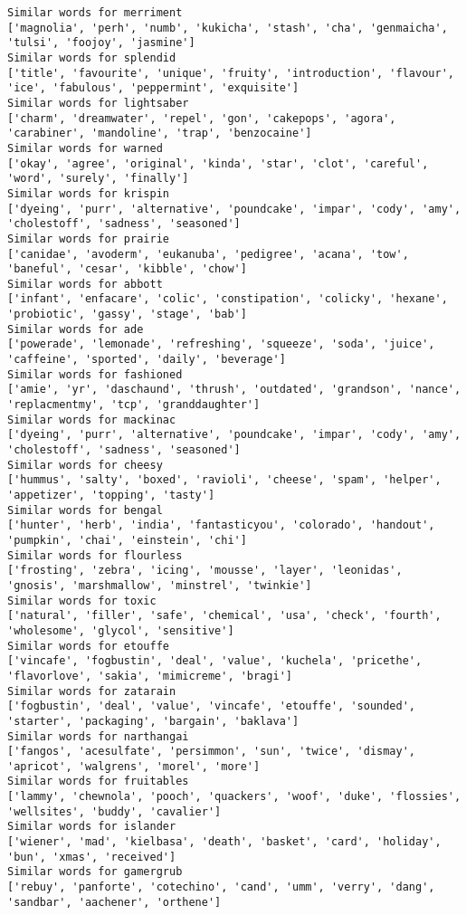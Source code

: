 \documentclass[11pt]{article}
\begin{document}
\begin{Verbatim}[commandchars=\\\{\}]
Similar words for merriment
['magnolia', 'perh', 'numb', 'kukicha', 'stash', 'cha', 'genmaicha', 'tulsi', 'foojoy', 'jasmine']
Similar words for splendid
['title', 'favourite', 'unique', 'fruity', 'introduction', 'flavour', 'ice', 'fabulous', 'peppermint', 'exquisite']
Similar words for lightsaber
['charm', 'dreamwater', 'repel', 'gon', 'cakepops', 'agora', 'carabiner', 'mandoline', 'trap', 'benzocaine']
Similar words for warned
['okay', 'agree', 'original', 'kinda', 'star', 'clot', 'careful', 'word', 'surely', 'finally']
Similar words for krispin
['dyeing', 'purr', 'alternative', 'poundcake', 'impar', 'cody', 'amy', 'cholestoff', 'sadness', 'seasoned']
Similar words for prairie
['canidae', 'avoderm', 'eukanuba', 'pedigree', 'acana', 'tow', 'baneful', 'cesar', 'kibble', 'chow']
Similar words for abbott
['infant', 'enfacare', 'colic', 'constipation', 'colicky', 'hexane', 'probiotic', 'gassy', 'stage', 'bab']
Similar words for ade
['powerade', 'lemonade', 'refreshing', 'squeeze', 'soda', 'juice', 'caffeine', 'sported', 'daily', 'beverage']
Similar words for fashioned
['amie', 'yr', 'daschaund', 'thrush', 'outdated', 'grandson', 'nance', 'replacmentmy', 'tcp', 'granddaughter']
Similar words for mackinac
['dyeing', 'purr', 'alternative', 'poundcake', 'impar', 'cody', 'amy', 'cholestoff', 'sadness', 'seasoned']
Similar words for cheesy
['hummus', 'salty', 'boxed', 'ravioli', 'cheese', 'spam', 'helper', 'appetizer', 'topping', 'tasty']
Similar words for bengal
['hunter', 'herb', 'india', 'fantasticyou', 'colorado', 'handout', 'pumpkin', 'chai', 'einstein', 'chi']
Similar words for flourless
['frosting', 'zebra', 'icing', 'mousse', 'layer', 'leonidas', 'gnosis', 'marshmallow', 'minstrel', 'twinkie']
Similar words for toxic
['natural', 'filler', 'safe', 'chemical', 'usa', 'check', 'fourth', 'wholesome', 'glycol', 'sensitive']
Similar words for etouffe
['vincafe', 'fogbustin', 'deal', 'value', 'kuchela', 'pricethe', 'flavorlove', 'sakia', 'mimicreme', 'bragi']
Similar words for zatarain
['fogbustin', 'deal', 'value', 'vincafe', 'etouffe', 'sounded', 'starter', 'packaging', 'bargain', 'baklava']
Similar words for narthangai
['fangos', 'acesulfate', 'persimmon', 'sun', 'twice', 'dismay', 'apricot', 'walgrens', 'morel', 'more']
Similar words for fruitables
['lammy', 'chewnola', 'pooch', 'quackers', 'woof', 'duke', 'flossies', 'wellsites', 'buddy', 'cavalier']
Similar words for islander
['wiener', 'mad', 'kielbasa', 'death', 'basket', 'card', 'holiday', 'bun', 'xmas', 'received']
Similar words for gamergrub
['rebuy', 'panforte', 'cotechino', 'cand', 'umm', 'verry', 'dang', 'sandbar', 'aachener', 'orthene']

\end{Verbatim}
\end{document}
